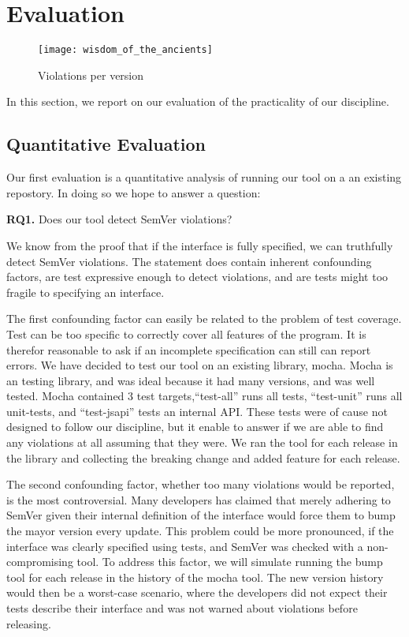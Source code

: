 \section{Evaluation}

\begin{figure}
\centering
\texttt{[image: wisdom\_of\_the\_ancients]}
\caption{Violations per version}
\end{figure}

In this section, we report on our evaluation of the practicality of
our discipline. 

\subsection{Quantitative Evaluation}

Our first evaluation is a quantitative analysis of running our tool on a
an existing repostory. In doing so we hope to answer a question:

{\bf RQ1.} Does our tool detect SemVer violations?

We know from the proof that if the interface is fully specified, we can
truthfully detect SemVer violations. The statement does contain
inherent confounding factors, are test expressive enough to detect
violations, and are tests might too fragile to specifying
an interface.

The first confounding factor can easily be related to the problem of 
test coverage. Test can be too specific to correctly cover all features
of the program. It is therefor reasonable to ask if an incomplete
specification can still can report errors. We have decided to test our
tool on an existing library, mocha\cite{mocha}. Mocha is an testing
library, and was ideal because it had many versions, and was well
tested. Mocha contained 3 test targets,``test-all'' runs all tests,
``test-unit'' runs all unit-tests, and ``test-jsapi'' tests an internal
API\@. These tests were of cause not designed to follow our discipline,
but it enable to answer if we are able to find any violations at all
assuming that they were. We ran the tool for each release in the library
and collecting the breaking change and added feature for each release. 

The second confounding factor, whether too many violations would be
reported, is the most controversial. Many developers has claimed that
merely adhering to SemVer given their internal definition of the 
interface would force them to bump the mayor version every
update\cite{backbone-2888,crawford-not-semver}. This problem could be
more pronounced, if the interface was clearly specified using tests,
and SemVer was checked with a non-compromising tool. To address this
factor, we will simulate running the bump tool for each release in the 
history of the mocha tool. The new version history would then be a
worst-case scenario, where the developers did not expect their tests
describe their interface and was not warned about violations before
releasing.

